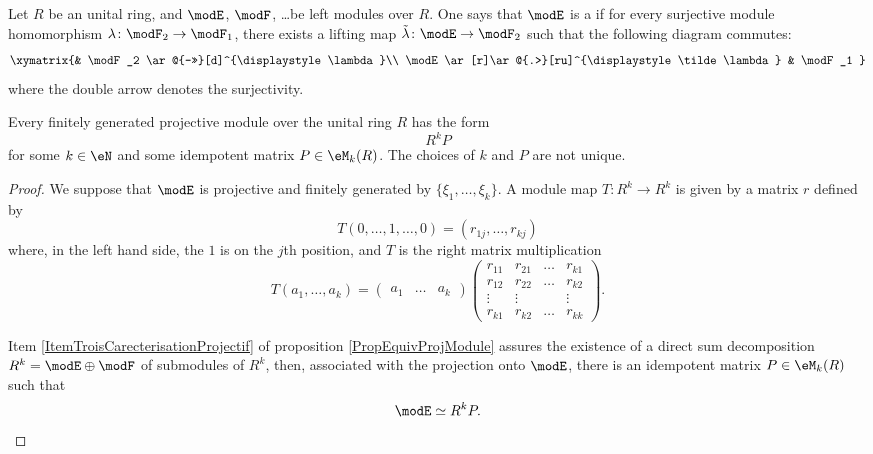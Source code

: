%
%

Let $R$ be an unital ring, and $\modE$, $\modF$, \ldots be left modules over $R$. One says that $\modE$ is a  if for every surjective module homomorphism $\lambda\colon \modF_2\to \modF_1$, there exists a lifting map $\tilde\lambda\colon \modE\to \modF_2$ such that the following diagram commutes:
\begin{equation}		\label{EqLiftPropProjModules}
\xymatrix{%
 					&  \modF_2 \ar@{->>}[d]^{\displaystyle\lambda}\\
   \modE \ar[r]\ar@{.>}[ru]^{\displaystyle\tilde\lambda}			&	\modF_1
}
\end{equation}
where the double arrow denotes the surjectivity. 

\begin{proposition}		\label{PropFGPRkP}
Every finitely generated projective module over the unital ring $R$ has the form 
\[ 
R^kP
\]
for some $k\in\eN$ and some idempotent matrix $P\in\eM_k(R)$. The choices of $k$ and $P$ are not unique.
\end{proposition}

\begin{proof}
We suppose that $\modE$ is projective and finitely generated by $\{ \xi_1,\ldots,\xi_k\}$. A module map $T\colon R^k\to R^k$ is given by a matrix $r$ defined by
\[ 
	T(0,\ldots,1,\ldots,0)=(r_{1j},\ldots,r_{kj})
\]
where, in the left hand side, the $1$ is on the $j$th position, and $T$ is the right matrix multiplication
\begin{equation}
	T(a_1,\ldots,a_k)=
\begin{pmatrix}
a_1&\ldots&a_k
\end{pmatrix}
\begin{pmatrix}
r_{11}	&	r_{21}	&\ldots	&r_{k1}\\
r_{12}	&	r_{22}	&\ldots	&r_{k2}\\
\vdots	&	\vdots	&	&\vdots\\
r_{k1}	&	r_{k2}	&\ldots	&r_{kk}
\end{pmatrix}.
\end{equation}

Item \ref{ItemTroisCarecterisationProjectif} of proposition \ref{PropEquivProjModule} assures the existence of a direct sum decomposition $R^k=\modE\oplus \modF$ of submodules of $R^k$, then, associated with the projection onto $\modE$, there is an idempotent matrix $P\in\eM_k(R)$ such that 
\begin{equation}		\label{EqMRkPdec}
	\modE\simeq R^kP.
\end{equation}
\end{proof}

